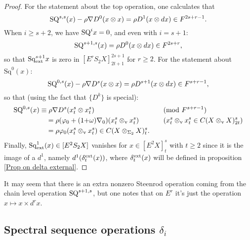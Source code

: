 \documentclass[11pt]{amsart}
\theoremstyle{plain}
\newtheorem{prop}[thm]{Proposition}
\theoremstyle{definition}
\let\phi\varphi
\renewcommand{\to}{\longrightarrow}
\theoremstyle{plain}
\newcommand{\twist}{\omega}
\newcommand{\Nabla}{\nabla}
\newcommand{\Sq}{\mathrm{Sq}}
\newcommand{\E}[5]{[E^{#1}_{#2}#3]^{#4}_{#5}}
\begin{document}
\begin{second quadrant homotopy}
\begin{proof}
For the statement about the top operation, one calculates that
\[\textup{SQ}^{s,s}(x)-\rho\Nabla D^0(x\otimes x)=\rho D^{1}(x\otimes dx)\in F^{2s+r-1}.\]
When $i\geq s+2$, we have $\textup{SQ}^{i}x=0$, and even with $i=s+1$:
\[\textup{SQ}^{s+1,s}(x)=\rho D^{0}(x\otimes dx)\in F^{2s+r},\]
so that $\Sq^{s+1}_\textup{ext}x$ is zero in $\E{r}{}{S_2X}{2s+1}{2t+1}$ for $r\geq2$.
For the statement about $\Sq^0(x)$:
\[\textup{SQ}^{0,s}(x)-\rho\Nabla D^s(x\otimes x)=\rho D^{s+1}(x\otimes dx)\in F^{s+r-1},\]
so that (using the fact that $\{D^k\}$ is special):
\begin{alignat*}{2}
\textup{SQ}^{0,s}(x)
&\equiv
\rho\Nabla D^s(x^s_t\otimes x^s_t)&&\textup{(mod $F^{s+r-1}$)}%
\\
&\quad =
\rho(\phi_0+(1{+}\twist)\Nabla_0)(x^s_t\otimes_\textup{v} x^s_t)%
&\quad&\text{($x^s_t\otimes_\textup{v} x^s_t\in C(X\otimes_\textup{v}X)_{2t}^{s}$)}\\
&\quad =
\rho\phi_0(x^s_t\otimes_\textup{v} x^s_t)\in C(X\otimes_{\Sigma_2} X)_{t}^{s}.
\end{alignat*}
Finally, $\Sq^1_\textup{ext}(x)\in\E{2}{}{S_2X}{}{}$ vanishes for $x\in \E{2}{}{X}{s}{t}$ with $t\geq2$ since it is the image of a $d^1$, namely $d^1(\delta_t^\textup{ext}(x))$, where $\delta_t^\textup{ext}(x)$ will be defined in proposition \ref{Prop on delta external}.
\end{proof}
It may seem that there is an extra nonzero Steenrod operation coming from the chain level operation $\textup{SQ}^{s+1,s}$, but one notes that on $E^r$ it's just the operation $x\mapsto x\times d^rx$.

\subsection{Spectral sequence operations $\delta_i$}


\end{second quadrant homotopy}
\end{document}
